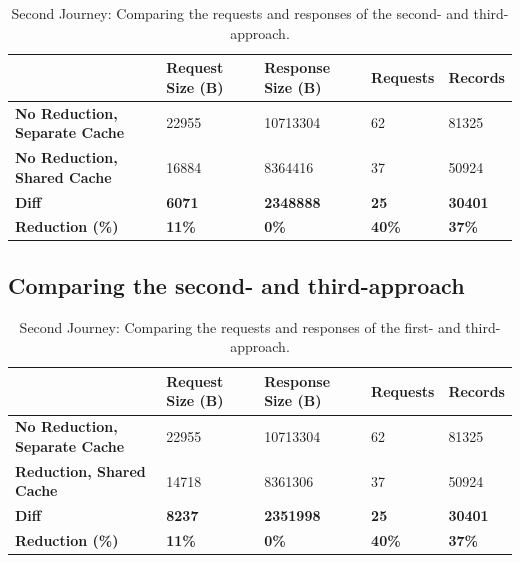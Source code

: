 \ifshowTables
\begin{table}[H]
  \begin{tabular}{|l|l|l|l|l|}
  \hline
  & \textbf{Request Size (B)} & \textbf{Response Size (B)} & \textbf{Requests} & \textbf{Records} \\
  \hline
  \textbf{No Reduction, Separate Cache} & 22955 & 10713304 & 62 & 81325 \\
  \hline
  \textbf{No Reduction, Shared Cache} & 16884 & 8364416 & 37 & 50924 \\
  \hline
  \hline
  \textbf{Diff} & \textbf{6071} & \textbf{2348888} & \textbf{25} & \textbf{30401} \\
  \hline
  \textbf{Reduction (\%)} & \textbf{11\%} & \textbf{0\%} & \textbf{40\%} & \textbf{37\%} \\
  \hline
  \end{tabular}
  \caption{Second Journey: Comparing the requests and responses of the second- and third-approach.}\label{table:results:size-comparison-second-path-cache-no-reduction-cache-reduction}
\end{table}
\fi

\subsection{Comparing the second- and third-approach}\label{subsection:results:comparison-second-path-second-third-approach}

\ifshowTables
\begin{table}[H]
  \begin{tabular}{|l|l|l|l|l|}
  \hline
  & \textbf{Request Size (B)} & \textbf{Response Size (B)} & \textbf{Requests} & \textbf{Records} \\
  \hline
  \textbf{No Reduction, Separate Cache} & 22955 & 10713304 & 62 & 81325 \\
  \hline
  \textbf{Reduction, Shared Cache} & 14718 & 8361306 & 37 & 50924 \\
  \hline
  \hline
  \textbf{Diff} & \textbf{8237} & \textbf{2351998} & \textbf{25} & \textbf{30401} \\
  \hline
  \textbf{Reduction (\%)} & \textbf{11\%} & \textbf{0\%} & \textbf{40\%} & \textbf{37\%} \\
  \hline
  \end{tabular}
  \caption{Second Journey: Comparing the requests and responses of the first- and third-approach.}\label{table:results:size-comparison-second-path-no-cache-no-reduction-cache-reduction}
\end{table}
\fi

